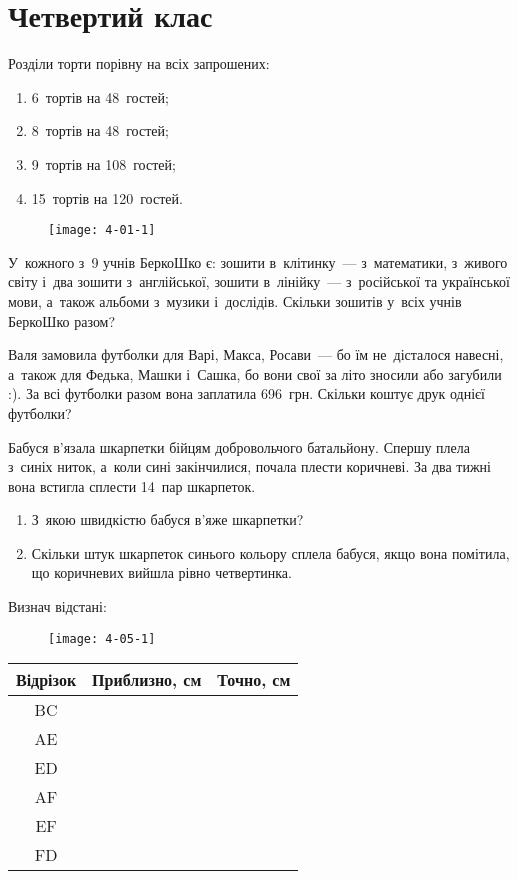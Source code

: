 \chapter{Четвертий клас}

\problem
Розділи торти порівну на всіх запрошених:
\begin{enumerate}
    \item 6~тортів на 48~гостей;
    \item 8~тортів на 48~гостей;
    \item 9~тортів на 108~гостей;
    \item 15~тортів на 120~гостей.
\end{enumerate}

\begin{figure}[ht]
    \centering
    \texttt{[image: 4-01-1]}
\end{figure}


\problem
У~кожного з~9 учнів БеркоШко є: зошити в~клітинку~--- з~математики,
з~живого світу і~два зошити з~англійської, зошити в~лінійку~---
з~російської та української мови, а~також альбоми з~музики і~дослідів.
Скільки зошитів у~всіх учнів БеркоШко разом?


\problem
Валя замовила футболки для Варі, Макса, Росави~--- бо їм не~дісталося навесні,
а~також для Федька, Машки і~Сашка, бо вони свої за літо зносили або загубили :).
За всі футболки разом вона заплатила 696~грн.
Скільки коштує друк однієї футболки? 


\problem
Бабуся в’язала шкарпетки бійцям добровольчого батальйону.
Спершу плела з~синіх ниток, а~коли сині закінчилися, почала плести коричневі.
За два тижні вона встигла сплести 14~пар шкарпеток.
\begin{enumerate}
    \item З~якою швидкістю бабуся в’яже шкарпетки? 
    \item Скільки штук шкарпеток синього кольору сплела бабуся,
    якщо вона помітила, що коричневих вийшла рівно четвертинка.
\end{enumerate}


\problem
Визнач відстані:

\begin{figure}[ht]
    \centering
    \texttt{[image: 4-05-1]}
\end{figure}

\begin{center}
\sffamily
\begin{tabular}{|c|c|c|}
    \hline
    Відрізок & Приблизно, см & Точно, см \\ \hline
    BC & & \\ \hline
    AE & & \\ \hline
    ED & & \\ \hline
    AF & & \\ \hline
    EF & & \\ \hline
    FD & & \\ \hline
\end{tabular}
\end{center}


